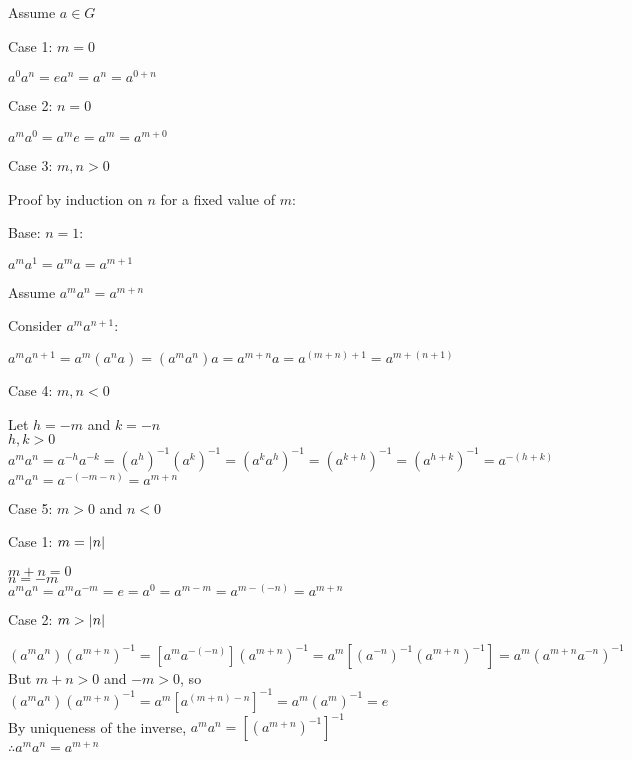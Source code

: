 \documentclass[letterpaper,12pt,fleqn]{article}
\begin{document}
\begin{theproof}
  Assume $a\in G$ \\

  \begin{description}
  \item{Case 1: $m=0$}

    $a^0a^n=ea^n=a^n=a^{0+n}$

  \item{Case 2: $n=0$}

    $a^ma^0=a^me=a^m=a^{m+0}$

  \item{Case 3: $m,n>0$}

    Proof by induction on $n$ for a fixed value of $m$:
    
    \begin{description}
    \item Base: $n=1$:
    
      $a^ma^1=a^ma=a^{m+1}$
    
    \item Assume $a^ma^n=a^{m+n}$

    \item Consider $a^ma^{n+1}$:
    
      $a^ma^{n+1}=a^m(a^na)=(a^ma^n)a=a^{m+n}a=a^{(m+n)+1}=a^{m+(n+1)}$
    \end{description}

  \item {Case 4: $m,n<0$}

    Let $h=-m$ and $k=-n$ \\
    $h,k>0$ \\
    $a^ma^n=a^{-h}a^{-k}=(a^h)^{-1}(a^k)^{-1}=(a^ka^h)^{-1}=(a^{k+h})^{-1}=
    (a^{h+k})^{-1}=a^{-(h+k)}$ \\
    $a^ma^n=a^{-(-m-n)}=a^{m+n}$

  \item{Case 5: $m>0$ and $n<0$}

    \begin{description}
    \item{Case 1: $m=\lvert n\rvert$}

      $m+n=0$ \\
      $n=-m$ \\
      $a^ma^n=a^ma^{-m}=e=a^0=a^{m-m}=a^{m-(-n)}=a^{m+n}$

    \item{Case 2: $m>\lvert n\rvert$}

      $(a^ma^n)(a^{m+n})^{-1}=[a^ma^{-(-n)}](a^{m+n})^{-1}=
      a^m[(a^{-n})^{-1}(a^{m+n})^{-1}]=a^m(a^{m+n}a^{-n})^{-1}$ \\
      But $m+n>0$ and $-m>0$, so \\
      $(a^ma^n)(a^{m+n})^{-1}=a^m[a^{(m+n)-n}]^{-1}=a^m(a^m)^{-1}=e$ \\
      By uniqueness of the inverse, $a^ma^n=[(a^{m+n})^{-1}]^{-1}$ \\
      $\therefore a^ma^n=a^{m+n}$


\end{description}
\end{description}
\end{theproof}
\end{document}

